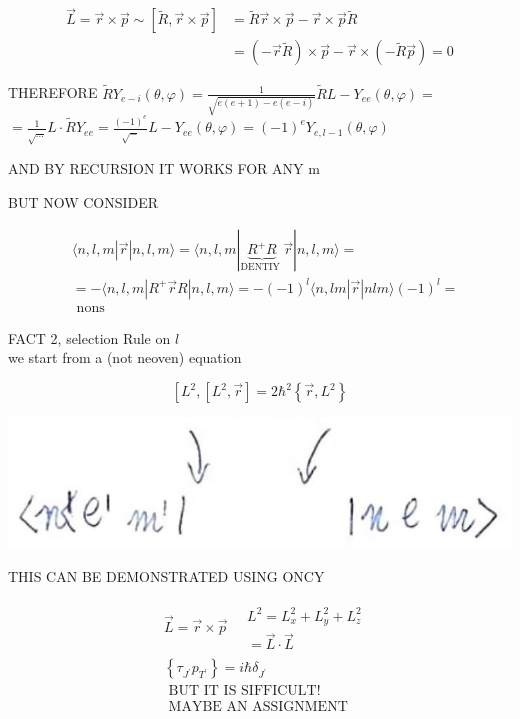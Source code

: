 \documentclass[10pt]{article}
\begin{document}
$$
\begin{aligned}
\vec{L}=\vec{r} \times \vec{p} \sim[\tilde{R}, \vec{r} \times \vec{p}] & =\tilde{R} \vec{r} \times \vec{p}-\vec{r} \times \vec{p} \tilde{R} \\
& =(-\vec{r} \tilde{R}) \times \vec{p}-\vec{r} \times(-\tilde{R} \vec{p})=0
\end{aligned}
$$

THEREFORE $\tilde{R} Y_{e-i}(\theta, \varphi)=\frac{1}{\sqrt{e(e+1)-e(e-i)}} \tilde{R} L-Y_{e e}(\theta, \varphi)=$\\
$=\frac{1}{\sqrt{\ldots}} L \cdot \tilde{R} Y_{e e}=\frac{(-1)^{e}}{\sqrt{-}} L-Y_{e e}(\theta, \varphi)=(-1)^{e} Y_{e, l-1}(\theta, \varphi)$

AND BY RECURSION IT WORKS FOR ANY m

BUT NOW CONSIDER

$$
\begin{aligned}
& \langle n, l, m| \vec{r}|n, l, m\rangle=\langle n, l, m| \underbrace{R^{+} R}_{\text {DENTIY }} \vec{r}|n, l, m\rangle= \\
& =-\langle n, l, m| R^{+} \vec{r} R|n, l, m\rangle=-(-1)^{l}\langle n, l m| \vec{r}|n l m\rangle(-1)^{l}= \\
& \text { nons }
\end{aligned}
$$

FACT 2, selection Rule on $l$\\
we start from a (not neoven) equation

$$
\left[L^{2},\left[L^{2}, \vec{r}\right]=2 \hbar^{2}\left\{\vec{r}, L^{2}\right\}\right.
$$

\begin{center}
\includegraphics[max width=\textwidth]{2025_10_16_22329e0f50bdd2511b17g-14}
\end{center}

THIS CAN BE DEMONSTRATED USING ONCY

$$
\begin{aligned}
& \vec{L}=\vec{r} \times \vec{p} \quad \begin{array}{l}
L^{2}=L_{x}^{2}+L_{y}^{2}+L_{z}^{2} \\
=\vec{L} \cdot \vec{L}
\end{array} \\
& \left\{\tau_{J^{\prime}} p_{T^{\prime}}\right\}=i \hbar \delta_{J^{\prime}} \\
& \text { BUT IT IS SIFFICULT! } \\
& \text { MAYBE AN ASSIGNMENT }
\end{aligned}
$$
\end{document}
